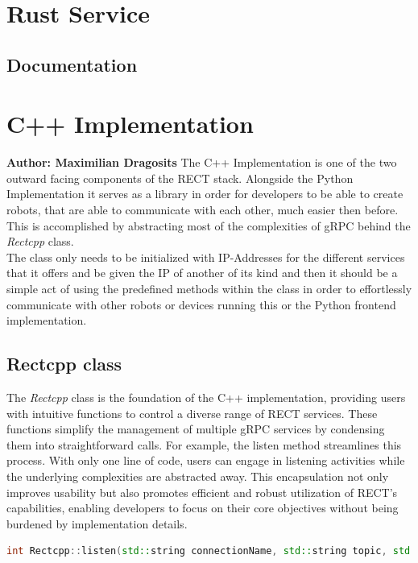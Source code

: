 \section{Rust Service}
\subsection{Documentation}

\section{C++ Implementation}
\textbf{Author: Maximilian Dragosits}
The C++ Implementation is one of the two outward facing components of the RECT stack. Alongside the Python Implementation 
it serves as a library in order for developers to be able to create robots, that are able to communicate with each other, much
easier then before. This is accomplished by abstracting most of the complexities of gRPC behind the \textit{Rectcpp} class. \\

The class only needs to be initialized with IP-Addresses for the different services that it offers and be given the IP of 
another of its kind and then it should be a simple act of using the predefined methods within the class in order to 
effortlessly communicate with other robots or devices running this or the Python frontend implementation.

\subsection{Rectcpp class}
The \textit{Rectcpp} class is the foundation of the C++ implementation, providing users with intuitive functions to control a diverse range of RECT services. 
These functions simplify the management of multiple gRPC services by condensing them into straightforward calls. For example, the listen method streamlines 
this process. With only one line of code, users can engage in listening activities while the underlying complexities are abstracted away. This encapsulation 
not only improves usability but also promotes efficient and robust utilization of RECT's capabilities, enabling developers to focus on their core objectives 
without being burdened by implementation details.

\begin{lstlisting}[language=c++]
  int Rectcpp::listen(std::string connectionName, std::string topic, std::string& returning);
\end{lstlisting}

